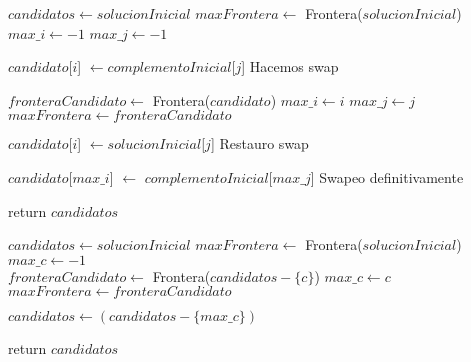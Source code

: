 \begin{algorithm}[H]
\begin{algorithmic}

    \State $candidatos \gets solucionInicial$
    \State $maxFrontera \gets$ Frontera($solucionInicial$)
    \State $max\_i \gets -1$
    \State $max\_j \gets -1$ \\

    \For{$i \in [0..|solucionInicial|)$}
        \For{$j \in [0..|complementoInicial|)$}

            \State $candidato$[$i$] $\gets complementoInicial$[$j$] \Comment Hacemos swap

                \State $fronteraCandidato \gets$ Frontera($candidato$)
                    \State $max\_i \gets i$
                    \State $max\_j \gets j$
                    \State $maxFrontera \gets fronteraCandidato$
                \EndIf
            \EndIf

            \State $candidato$[$i$] $\gets solucionInicial$[$j$] \Comment Restauro swap
        \EndFor
    \EndFor

        \State $candidato$[$max\_i$] $\gets$ $complementoInicial$[$max\_j$] \Comment Swapeo definitivamente
    \EndIf

    \State return $candidatos$

\EndFunction
\end{algorithmic}
\end{algorithm}


\begin{algorithm}[H]
\begin{algorithmic}
    \State $candidatos \gets solucionInicial$
    \State $maxFrontera \gets$ Frontera($solucionInicial$)
    \State $max\_c \gets -1$  \\

            \State $fronteraCandidato \gets$ Frontera($candidatos - \{c\}$)
                \State $max\_c \gets c$
                \State $maxFrontera \gets fronteraCandidato$ \\
            \EndIf
        \EndIf
    \EndFor

        \State $candidatos \gets (candidatos - \{max\_c\})$
    \EndIf

    \State return $candidatos$

\EndFunction
\end{algorithmic}
\end{algorithm}

